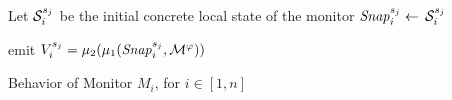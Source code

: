 \begin{algorithm}[H]
\small
{}
Let $\mathcal{S}_i^{s_j}$ be the initial concrete local state of the monitor    \;  %
$\LS_i^{\state_j} \gets$ $\mathcal{S}_i^{s_j}$
\iffalse
\For{\rm some fixed number of rounds $r \geqslant 0$}{   \label{line:round6}
$\SM_i^{\state_j} \gets \pred(\LS_i^{\state_j})$\tcc*[r]{\it write current knowledge in shared memory}%
$\LS_i^{\state_j} \gets$ $\SM^{\state_j}$\tcc*[r]{\it take a snapshot of the shared memory}
}%
\fi
emit $V_i^{s_j}= \mu_2(\mu_1(\mathit{Snap}_i^{s_j}, \mathcal{M}^\varphi)) $            
\label{line:emit6}
\caption{Behavior of Monitor $M_i$, for $i\in [1, n]$}
\label{alg:localmonalgo6}
 \end{algorithm}

